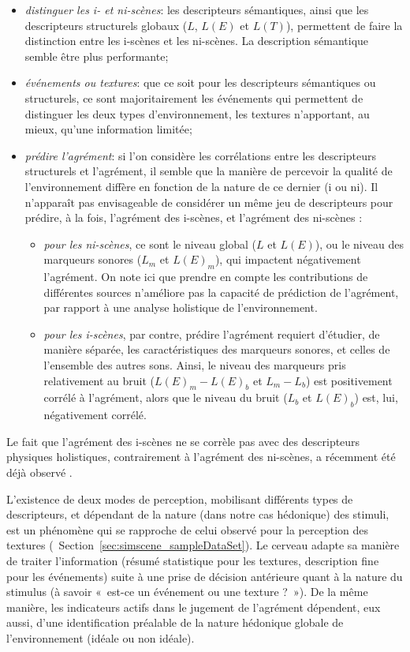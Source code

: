 \documentclass[twoside,twocolumn]{article}
\begin{document}
\begin{itemize}
\item \emph{distinguer les i- et ni-scènes}: les descripteurs sémantiques, ainsi que les descripteurs structurels globaux ($L$, $L(E)$ et $L(T)$), permettent de faire la distinction entre les i-scènes et les ni-scènes. La description sémantique semble être plus performante;
\item \emph{événements ou textures}: que ce soit pour les descripteurs sémantiques ou structurels, ce sont majoritairement les événements qui permettent de distinguer les deux types d'environnement, les textures n'apportant, au mieux, qu'une information limitée;
\item \emph{prédire l'agrément}: si l'on considère les corrélations entre les descripteurs structurels et l'agrément, il semble que la manière de percevoir la qualité de l'environnement diffère en fonction de la nature de ce dernier (i ou ni). Il n'apparaît pas envisageable de considérer un même jeu de descripteurs pour prédire, à la fois, l'agrément des i-scènes, et l'agrément des ni-scènes :

\begin{itemize}

\item \emph{pour les ni-scènes}, ce sont le niveau global ($L$ et $L(E)$), ou le niveau des marqueurs sonores ($L_m$ et $L(E)_{m}$), qui impactent négativement l'agrément. On note ici que prendre en compte les contributions de différentes sources n'améliore pas la capacité de prédiction de l'agrément, par rapport à une analyse holistique de l'environnement.

\item \emph{pour les i-scènes}, par contre, prédire l'agrément requiert d'étudier, de manière séparée, les caractéristiques des marqueurs sonores, et celles de l'ensemble des autres sons. Ainsi, le niveau des marqueurs pris relativement au bruit ($L(E)_m-L(E)_b$ et $L_m-L_b$) est positivement corrélé à l'agrément, alors que le niveau du bruit ($L_b$ et $L(E)_b$) est, lui, négativement corrélé.
\end{itemize}
\end{itemize}

Le fait que l'agrément des i-scènes ne se corrèle pas avec des descripteurs physiques holistiques, contrairement à l'agrément des ni-scènes, a récemment été déjà observé \cite{gozalo2015relationship}.

L'existence de deux modes de perception, mobilisant différents types de descripteurs, et dépendant de la nature (dans notre cas hédonique) des stimuli, est un phénomène qui se rapproche de celui observé pour la perception des textures (\cf~Section~\ref{sec:simscene_sampleDataSet}). Le cerveau adapte sa manière de traiter l'information (résumé statistique pour les textures, description fine pour les événements) suite à une prise de décision antérieure quant à la nature du stimulus (à savoir «~est-ce un événement ou une texture ?~»). De la même manière, les indicateurs actifs dans le jugement de l'agrément dépendent, eux aussi, d'une identification préalable de la nature hédonique globale de l'environnement (idéale ou non idéale).
\end{document}
